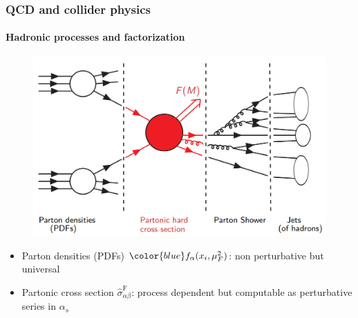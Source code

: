 \documentclass[aspectratio=43]{beamer}
\begin{document}
\begin{frame}

	\frametitle{QCD and collider physics}
	\framesubtitle{Hadronic processes and factorization}
	
	\footnotesize
	
	\begin{figure}
		\includegraphics[width = 7 cm]{plots/part1/chapter2/factorization_2.png}
	\end{figure}
	
	\begin{itemize}
		\item Parton densities (PDFs) ${\color{blue} f_{\alpha}(x_{i}, \mu_{F}^{2})}$: non perturbative but universal
		\item Partonic cross section {\color{red}$\hat{\sigma}^{\textrm{F}}_{\alpha \beta}$}: process dependent but computable as perturbative series in $\alpha_{s}$
	\end{itemize}

\end{frame}
\end{document}
